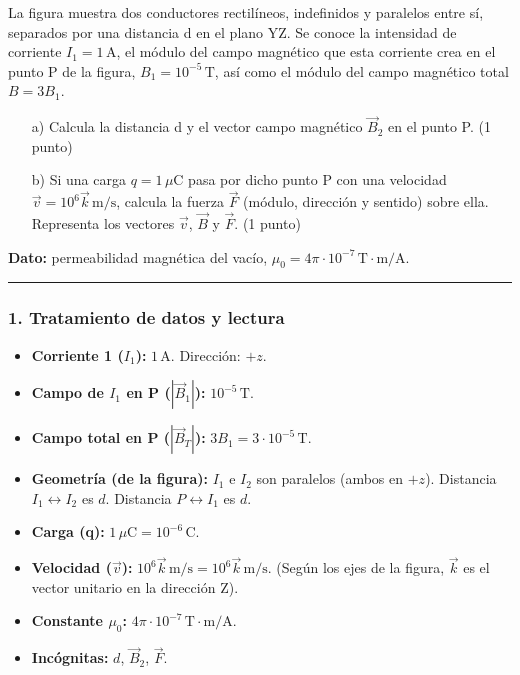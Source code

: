 \begin{cajaenunciado}
La figura muestra dos conductores rectilíneos, indefinidos y paralelos entre sí, separados por una distancia d en el plano YZ. Se conoce la intensidad de corriente $I_1=1\,\text{A}$, el módulo del campo magnético que esta corriente crea en el punto P de la figura, $B_1 = 10^{-5}\,\text{T}$, así como el módulo del campo magnético total $B=3B_1$.
\begin{enumerate}
    \item[a)] Calcula la distancia d y el vector campo magnético $\vec{B}_2$ en el punto P. (1 punto)
    \item[b)] Si una carga $q=1\,\mu\text{C}$ pasa por dicho punto P con una velocidad $\vec{v}=10^6\vec{k}\,\text{m/s}$, calcula la fuerza $\vec{F}$ (módulo, dirección y sentido) sobre ella. Representa los vectores $\vec{v}$, $\vec{B}$ y $\vec{F}$. (1 punto)
\end{enumerate}
\textbf{Dato:} permeabilidad magnética del vacío, $\mu_0=4\pi\cdot10^{-7}\,\text{T}\cdot\text{m/A}$.

\end{cajaenunciado}
\hrule

\subsubsection*{1. Tratamiento de datos y lectura}
\begin{itemize}
    \item \textbf{Corriente 1 ($I_1$):} $1\,\text{A}$. Dirección: $+z$.
    \item \textbf{Campo de $I_1$ en P ($|\vec{B}_1|$):} $10^{-5}\,\text{T}$.
    \item \textbf{Campo total en P ($|\vec{B}_T|$):} $3B_1 = 3\cdot10^{-5}\,\text{T}$.
    \item \textbf{Geometría (de la figura):} $I_1$ e $I_2$ son paralelos (ambos en $+z$). Distancia $I_1 \leftrightarrow I_2$ es $d$. Distancia $P \leftrightarrow I_1$ es $d$.
    \item \textbf{Carga (q):} $1\,\mu\text{C} = 10^{-6}\,\text{C}$.
    \item \textbf{Velocidad ($\vec{v}$):} $10^6\vec{k}\,\text{m/s} = 10^6\vec{k}\,\text{m/s}$. (Según los ejes de la figura, $\vec{k}$ es el vector unitario en la dirección Z).
    \item \textbf{Constante $\mu_0$:} $4\pi\cdot10^{-7}\,\text{T}\cdot\text{m/A}$.
    \item \textbf{Incógnitas:} $d$, $\vec{B}_2$, $\vec{F}$.
\end{itemize}

